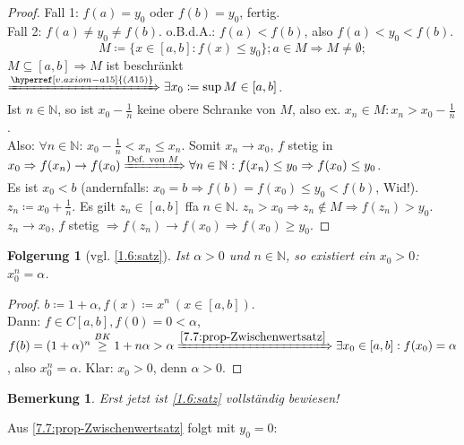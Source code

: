 \documentclass[14pt,titlepage,ngerman,a4paper,headsepline,DIV15,halfparskip*]{scrartcl}
\newcommand{\N}{\mathbb{N}}
\theoremstyle{named}
\theoremstyle{dotless}
\newtheorem*{bemerkung}{Bemerkung}
\newtheorem*{folgerung}{Folgerung}
\begin{document}
\begin{proof}
	Fall 1: $f(a) = y_{0}$ oder $f(b) = y_{0}$, fertig. \\
	Fall 2: $f(a) \neq y_{0} \neq f(b)$. o.B.d.A.: $f(a) < f(b)$, also $f(a) < y_{0} < f(b)$.
	$$ M \coloneqq \{ x \in [a, b]: f(x) \leq y_{0} \}; a \in M \Rightarrow M \neq \emptyset; $$
	$M \subseteq [a, b] \Rightarrow M$ ist beschränkt $\xRightarrow[]{\hyperref[v.axiom-a15]{(A15)}} \exists x_{0} \coloneqq \sup M \in [a, b]$.  \\
	Ist $n \in \N$, so ist $x_{0} - \frac{1}{n}$ keine obere Schranke von $M$, also ex. $x_{n} \in M: x_{n} > x_{0} - \frac{1}{n}$. \\
	Also: $\forall n \in \N$: $x_{0} - \frac{1}{n} < x_{n} \leq x_{n}$. Somit $x_{n} \rightarrow x_{0}$, $f$ stetig in $x_{0} \Rightarrow f(x_{n}) \rightarrow f(x_{0}) \xRightarrow[]{\text{Def. von }M} \forall n \in \N: f(x_{n}) \leq y_{0} \Rightarrow f(x_{0}) \leq y_{0}$. \\
	Es ist $x_{0} < b$ (andernfalls: $x_{0} = b \Rightarrow f(b) = f(x_{0}) \leq y_{0} < f(b)$, Wid!). \\
	$z_{n} \coloneqq x_{0} + \frac{1}{n}$. Es gilt $z_{n} \in [a, b]$ ffa $n \in \N$. $z_{n} > x_{0} \Rightarrow z_{n} \notin M \Rightarrow f(z_{n}) > y_{0}$. $z_{n} \rightarrow x_{0}$, $f$ stetig $\Rightarrow f(z_{n}) \rightarrow f(x_{0}) \Rightarrow f(x_{0}) \geq y_{0}$.
\end{proof}


\begin{folgerung}[vgl. \ref{1.6:satz}]
	Ist $\alpha > 0$ und $n \in \N$, so existiert ein $x_{0} > 0$: $x_{0}^{n} = \alpha$.	
\end{folgerung}

\begin{proof}
	$b \coloneqq 1 + \alpha, f(x) \coloneqq x^{n} ~(x \in [a, b])$. \\
	Dann: $f \in C[a, b], f(0) = 0 < \alpha$, $f(b) = (1 + \alpha)^{n} \overset{BK}{\geq} 1 + n \alpha > \alpha \xRightarrow[]{\ref{7.7:prop-Zwischenwertsatz}} \exists x_{0} \in [a, b]: f(x_{0}) = \alpha$, also $x_{0}^{n} = \alpha$. Klar: $x_{0} > 0$, denn $\alpha > 0$.
\end{proof}

\begin{bemerkung}
	Erst jetzt ist \ref{1.6:satz} vollständig bewiesen!
\end{bemerkung}


Aus \ref{7.7:prop-Zwischenwertsatz} folgt mit $y_{0} = 0$:
\end{document}
